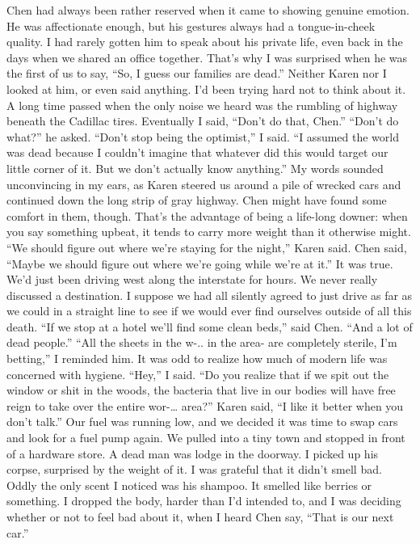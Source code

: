 \documentclass[a4paper]{article}
\begin{document}
Chen had always been rather reserved when it came to showing genuine emotion. He was affectionate enough, but his gestures always had a tongue-in-cheek quality. I had rarely gotten him to speak about his private life, even back in the days when we shared an office together. That’s why I was surprised when he was the first of us to say, “So, I guess our families are dead.”
Neither Karen nor I looked at him, or even said anything. I’d been trying hard not to think about it. A long time passed when the only noise we heard was the rumbling of highway beneath the Cadillac tires. Eventually I said, “Don’t do that, Chen.”
“Don’t do what?” he asked.
“Don’t stop being the optimist,” I said. “I assumed the world was dead because I couldn’t imagine that whatever did this would target our little corner of it. But we don’t actually know anything.”
My words sounded unconvincing in my ears, as Karen steered us around a pile of wrecked cars and continued down the long strip of gray highway. Chen might have found some comfort in them, though. That’s the advantage of being a life-long downer: when you say something upbeat, it tends to carry more weight than it otherwise might.
“We should figure out where we’re staying for the night,” Karen said.
Chen said, “Maybe we should figure out where we’re going while we’re at it.”
It was true. We’d just been driving west along the interstate for hours. We never really discussed a destination. I suppose we had all silently agreed to just drive as far as we could in a straight line to see if we would ever find ourselves outside of all this death.
“If we stop at a hotel we’ll find some clean beds,” said Chen. “And a lot of dead people.”
“All the sheets in the w-.. in the area- are completely sterile, I’m betting,” I reminded him. It was odd to realize how much of modern life was concerned with hygiene.
“Hey,” I said. “Do you realize that if we spit out the window or shit in the woods, the bacteria that live in our bodies will have free reign to take over the entire wor-… area?”
Karen said, “I like it better when you don’t talk.”
Our fuel was running low, and we decided it was time to swap cars and look for a fuel pump again. We pulled into a tiny town and stopped in front of a hardware store. A dead man was lodge in the doorway.
I picked up his corpse, surprised by the weight of it. I was grateful that it didn’t smell bad. Oddly the only scent I noticed was his shampoo. It smelled like berries or something.
I dropped the body, harder than I’d intended to, and I was deciding whether or not to feel bad about it, when I heard Chen say, “That is our next car.”
\end{document}
